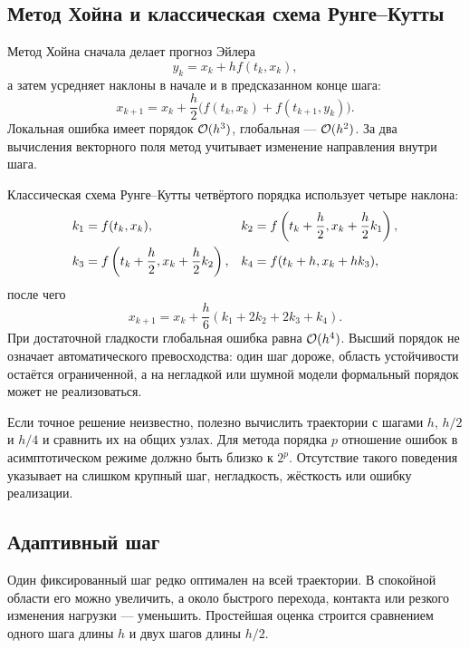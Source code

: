 \subsection{Метод Хойна и классическая схема Рунге--Кутты}

Метод Хойна сначала делает прогноз Эйлера
\begin{equation}
\label{eq:heun-predictor-v04}
y_k=x_k+h f(t_k,x_k),
\end{equation}
а затем усредняет наклоны в начале и в предсказанном конце шага:
\begin{equation}
\label{eq:heun-corrector-v04}
x_{k+1}
=
x_k+\frac h2
\bigl(
 f(t_k,x_k)+f(t_{k+1},y_k)
\bigr).
\end{equation}
Локальная ошибка имеет порядок $\mathcal{O}(h^3)$, глобальная --- $\mathcal{O}(h^2)$. За два вычисления векторного поля метод учитывает изменение направления внутри шага.

Классическая схема Рунге--Кутты четвёртого порядка использует четыре наклона:
\begin{align}
 k_1&=f(t_k,x_k),
 &
 k_2&=f\left(t_k+\frac h2,x_k+\frac h2k_1\right),
 \notag\\
 k_3&=f\left(t_k+\frac h2,x_k+\frac h2k_2\right),
 &
 k_4&=f(t_k+h,x_k+hk_3),
\label{eq:rk4-stages-v04}
\end{align}
после чего
\begin{equation}
\label{eq:rk4-update-v04}
x_{k+1}
=
x_k+\frac h6(k_1+2k_2+2k_3+k_4).
\end{equation}
При достаточной гладкости глобальная ошибка равна $\mathcal{O}(h^4)$. Высший порядок не означает автоматического превосходства: один шаг дороже, область устойчивости остаётся ограниченной, а на негладкой или шумной модели формальный порядок может не реализоваться.

\begin{computationalnote}
Если точное решение неизвестно, полезно вычислить траектории с шагами $h$, $h/2$ и $h/4$ и сравнить их на общих узлах. Для метода порядка $p$ отношение ошибок в асимптотическом режиме должно быть близко к $2^p$. Отсутствие такого поведения указывает на слишком крупный шаг, негладкость, жёсткость или ошибку реализации.
\end{computationalnote}

\subsection{Адаптивный шаг}

Один фиксированный шаг редко оптимален на всей траектории. В спокойной области его можно увеличить, а около быстрого перехода, контакта или резкого изменения нагрузки --- уменьшить. Простейшая оценка строится сравнением одного шага длины $h$ и двух шагов длины $h/2$.

